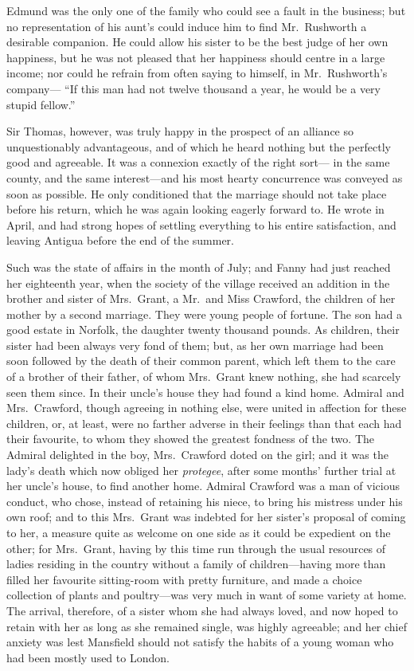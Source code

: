 Edmund was the only one of the family who could see a fault
in the business; but no representation of his aunt's could
induce him to find Mr.\ Rushworth a desirable companion.
He could allow his sister to be the best judge of her
own happiness, but he was not pleased that her happiness
should centre in a large income; nor could he refrain
from often saying to himself, in Mr.\ Rushworth's company---%
``If this man had not twelve thousand a year, he would be
a very stupid fellow.''

Sir Thomas, however, was truly happy in the prospect of an
alliance so unquestionably advantageous, and of which he
heard nothing but the perfectly good and agreeable.
It was a connexion exactly of the right sort---%
in the same county, and the same interest---and his most
hearty concurrence was conveyed as soon as possible.
He only conditioned that the marriage should not take
place before his return, which he was again looking
eagerly forward to.  He wrote in April, and had strong
hopes of settling everything to his entire satisfaction,
and leaving Antigua before the end of the summer.

Such was the state of affairs in the month of July;
and Fanny had just reached her eighteenth year, when the
society of the village received an addition in the brother
and sister of Mrs.\ Grant, a Mr.\ and Miss Crawford,
the children of her mother by a second marriage.
They were young people of fortune.  The son had a good
estate in Norfolk, the daughter twenty thousand pounds.
As children, their sister had been always very fond
of them; but, as her own marriage had been soon followed
by the death of their common parent, which left them
to the care of a brother of their father, of whom
Mrs.\ Grant knew nothing, she had scarcely seen them since.
In their uncle's house they had found a kind home.
Admiral and Mrs.\ Crawford, though agreeing in nothing else,
were united in affection for these children, or, at least,
were no farther adverse in their feelings than that each
had their favourite, to whom they showed the greatest
fondness of the two.  The Admiral delighted in the boy,
Mrs.\ Crawford doted on the girl; and it was the lady's
death which now obliged her \emph{protegee}, after some months'
further trial at her uncle's house, to find another home.
Admiral Crawford was a man of vicious conduct, who chose,
instead of retaining his niece, to bring his mistress
under his own roof; and to this Mrs.\ Grant was indebted
for her sister's proposal of coming to her, a measure quite
as welcome on one side as it could be expedient on the other;
for Mrs.\ Grant, having by this time run through the usual
resources of ladies residing in the country without a
family of children---having more than filled her favourite
sitting-room with pretty furniture, and made a choice
collection of plants and poultry---was very much in want
of some variety at home.  The arrival, therefore, of a sister
whom she had always loved, and now hoped to retain with
her as long as she remained single, was highly agreeable;
and her chief anxiety was lest Mansfield should not satisfy
the habits of a young woman who had been mostly used
to London.

